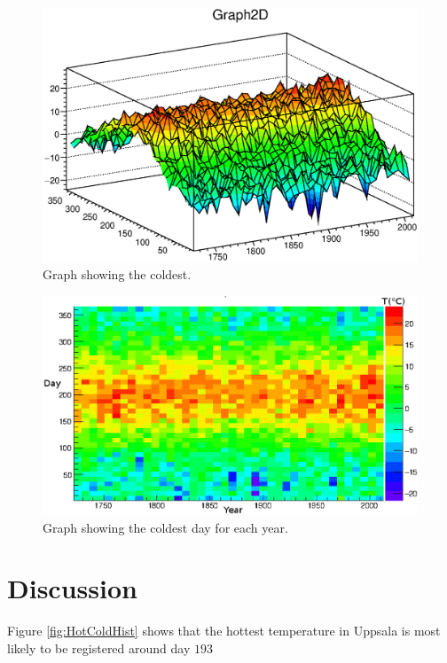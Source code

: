 \begin{figure}[h]
\begin{center}
\includegraphics[width=12cm]{2Dgraph1.eps}
\caption{Graph showing the coldest.}
\label{fig:3D}
\end{center}
\end{figure}

\begin{figure}[h]
\begin{center}
\includegraphics[width=12cm]{2Dgraphint.eps}
\caption{Graph showing the coldest day for each year.}
\label{fig:top3D}
\end{center}
\end{figure}

\section{Discussion}\label{sec:Discussion}
Figure \ref{fig:HotColdHist} shows that the hottest temperature in Uppsala is most likely to be registered around day $193$



 
 
